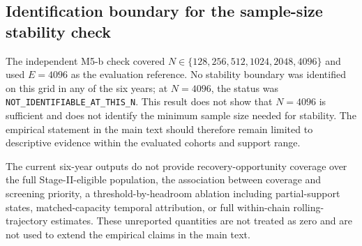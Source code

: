 \documentclass[10pt,a4paper]{article}
\numberwithin{equation}{section}
\begin{document}
\subsection{Identification boundary for the sample-size stability check}
The independent M5-b check covered $N\in\{128,256,512,1024,2048,4096\}$ and used $E=4096$ as the evaluation reference. No stability boundary was identified on this grid in any of the six years; at $N=4096$, the status was \texttt{NOT\_IDENTIFIABLE\_AT\_THIS\_N}. This result does not show that $N=4096$ is sufficient and does not identify the minimum sample size needed for stability. The empirical statement in the main text should therefore remain limited to descriptive evidence within the evaluated cohorts and support range.

The current six-year outputs do not provide recovery-opportunity coverage over the full Stage-II-eligible population, the association between coverage and screening priority, a threshold-by-headroom ablation including partial-support states, matched-capacity temporal attribution, or full within-chain rolling-trajectory estimates. These unreported quantities are not treated as zero and are not used to extend the empirical claims in the main text.
\end{document}
